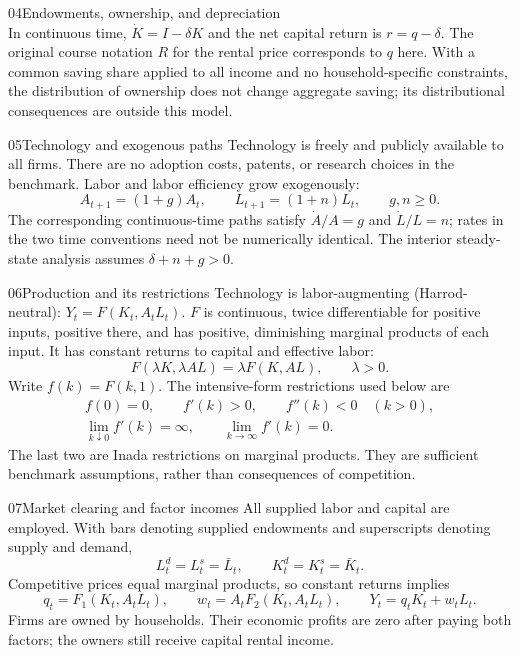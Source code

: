 \begin{modelsetup}[1]
\begin{modelcondition}{04}{Endowments, ownership, and depreciation}
\[\]
In continuous time, $\dot K=I-\delta K$ and the net capital return is
$r=q-\delta$. The original course notation $R$ for the rental price corresponds
to $q$ here. With a common saving share applied to all income and no
household-specific constraints, the distribution of ownership does not change
aggregate saving; its distributional consequences are outside this model.
\end{modelcondition}
\begin{modelcondition}{05}{Technology and exogenous paths}
Technology is freely and publicly available to all firms. There are no
adoption costs, patents, or research choices in the benchmark. Labor and
labor efficiency grow exogenously:
\[
A_{t+1}=(1+g)A_t,\qquad L_{t+1}=(1+n)L_t,\qquad g,n\geq0.
\]
The corresponding continuous-time paths satisfy $\dot A/A=g$ and $\dot L/L=n$;
rates in the two time conventions need not be numerically identical. The
interior steady-state analysis assumes $\delta+n+g>0$.
\end{modelcondition}
\begin{modelcondition}{06}{Production and its restrictions}
Technology is labor-augmenting (Harrod-neutral): $Y_t=F(K_t,A_tL_t)$.
$F$ is continuous, twice differentiable for positive inputs, positive there,
and has positive, diminishing marginal products of each input. It has constant
returns to capital and effective labor:
\[
F(\lambda K,\lambda AL)=\lambda F(K,AL),\qquad \lambda>0.
\]
Write $f(k)=F(k,1)$. The intensive-form restrictions used below are
\[
\begin{gathered}
f(0)=0,\qquad f'(k)>0,\qquad f''(k)<0\quad(k>0),\\
\lim_{k\downarrow0}f'(k)=\infty,\qquad
\lim_{k\to\infty}f'(k)=0.
\end{gathered}
\]
The last two are Inada restrictions on marginal products. They are sufficient
benchmark assumptions, rather than consequences of competition.
\end{modelcondition}
\begin{modelcondition}{07}{Market clearing and factor incomes}
All supplied labor and capital are employed. With bars denoting supplied
endowments and superscripts denoting supply and demand,
\[
L_t^d=L_t^s=\bar L_t,\qquad K_t^d=K_t^s=\bar K_t.
\]
Competitive prices equal marginal products, so constant returns implies
\[
q_t=F_1(K_t,A_tL_t),\qquad w_t=A_tF_2(K_t,A_tL_t),
\qquad Y_t=q_tK_t+w_tL_t.
\]
Firms are owned by households. Their economic profits are zero after paying
both factors; the owners still receive capital rental income.

\end{modelcondition}
\end{modelsetup}
